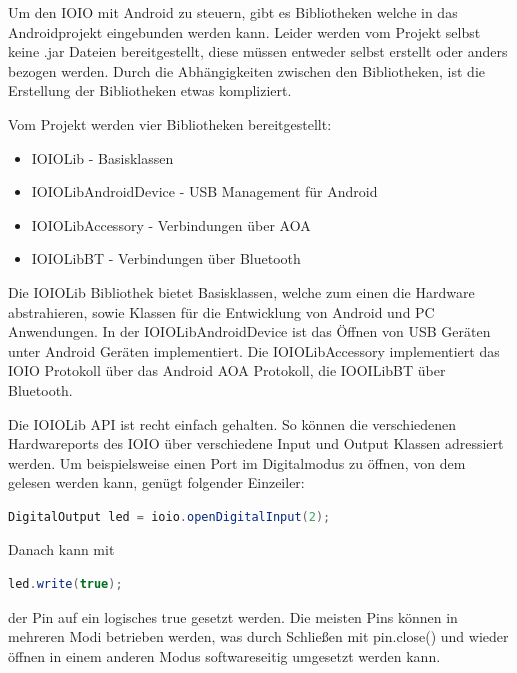 \documentclass[12pt,journal,compsoc]{IEEEtran}
\begin{document}
Um den IOIO mit Android zu steuern, gibt es Bibliotheken welche in das Androidprojekt eingebunden werden kann.
Leider werden vom Projekt selbst keine .jar Dateien bereitgestellt, diese müssen entweder selbst erstellt oder anders bezogen werden. Durch die Abhängigkeiten zwischen den Bibliotheken, ist die Erstellung der Bibliotheken etwas kompliziert.

Vom Projekt werden vier Bibliotheken bereitgestellt:

\begin{itemize}
	\item IOIOLib - Basisklassen 
	\item IOIOLibAndroidDevice - USB Management für Android
	\item IOIOLibAccessory - Verbindungen über AOA
	\item IOIOLibBT - Verbindungen über Bluetooth
\end{itemize}

Die IOIOLib Bibliothek bietet Basisklassen, welche zum einen die Hardware abstrahieren, sowie Klassen für die Entwicklung von Android und PC Anwendungen.
In der IOIOLibAndroidDevice ist das Öffnen von USB Geräten unter Android Geräten implementiert.
Die IOIOLibAccessory implementiert das IOIO Protokoll über das Android AOA Protokoll, die IOOILibBT über Bluetooth.

Die IOIOLib API ist recht einfach gehalten.
So können die verschiedenen Hardwareports des IOIO über verschiedene Input und Output Klassen adressiert werden.
Um beispielsweise einen Port im Digitalmodus zu öffnen, von dem gelesen werden kann, genügt folgender Einzeiler:

\begin{lstlisting}[language=Java]
DigitalOutput led = ioio.openDigitalInput(2); 
\end{lstlisting}

Danach kann mit
\begin{lstlisting}[language=Java]
led.write(true); 
\end{lstlisting}
der Pin auf ein logisches true gesetzt werden.
Die meisten Pins können in mehreren Modi betrieben werden, was durch Schließen mit pin.close() und wieder öffnen in einem anderen Modus softwareseitig umgesetzt werden kann. 
\end{document}
